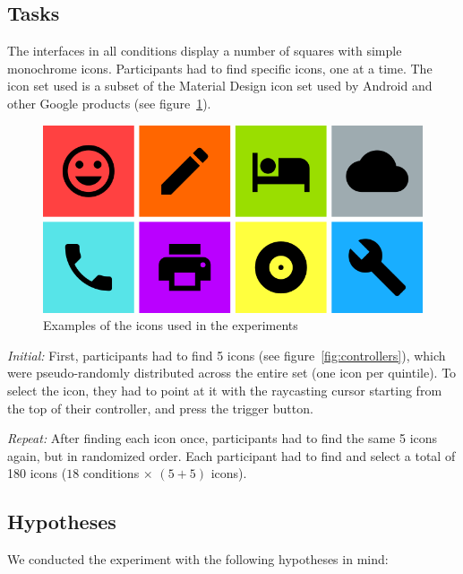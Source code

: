 \documentclass[nobib]{tufte-book} %
\begin{document}
\subsection{Tasks}
The interfaces in all conditions display a number of squares with simple monochrome icons. Participants had to find specific icons, one at a time. The icon set used is a subset of the Material Design icon set used by Android and other Google products (see figure~\ref{fig:material-icons}).

\begin{figure}
  \includegraphics{material-icons.png}
  \caption{Examples of the icons used in the experiments}
  \label{fig:material-icons}
\end{figure}

\emph{Initial:} First, participants had to find 5 icons (see figure~\ref{fig:controllers}), which were pseudo-randomly distributed across the entire set (one icon per quintile). To select the icon, they had to point at it with the raycasting cursor starting from the top of their controller, and press the trigger button.

\emph{Repeat:} After finding each icon once, participants had to find the same 5 icons again, but in randomized order. Each participant had to find and select a total of 180 icons ($18$ conditions $\times$ $(5 + 5) $ icons).

\subsection{Hypotheses}
We conducted the experiment with the following hypotheses in mind:
\end{document}

